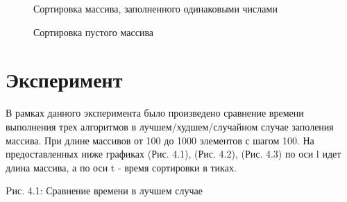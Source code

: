 \documentclass[12pt]{report}
\begin{document}
\begin{figure}[h]
\caption{Сортировка массива, заполненного одинаковыми числами}
\label{ris:image}
\end{figure}
\newpage
\begin{figure}[h]
\caption{Сортировка пустого массива}
\label{ris:image}
\end{figure}

\section{Эксперимент}
В рамках данного эксперимента было произведено сравнение времени выполнения трех алгоритмов в лучшем/худшем/случайном
случае заполения массива. При длине массивов от 100 до 1000 элементов с шагом 100. На предоставленных ниже графиках (Рис. 4.1), (Рис. 4.2), (Рис. 4.3)
по оси l идет длина массива, а по оси t - время сортировки в тиках.

\begin{center}
Pис. 4.1: Сравнение времени в лучшем случае
\end{center}
\end{document}
